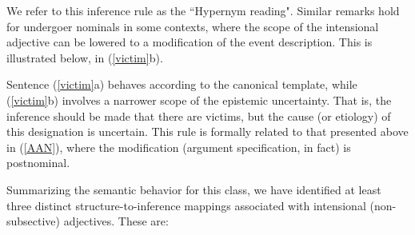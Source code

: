 \documentclass[10pt]{article}
\begin{document}
\noindent We refer to this inference rule as the ``Hypernym reading". 
Similar remarks hold for undergoer nominals in some contexts, where the scope of the intensional adjective can be lowered to a modification of the event description. This is illustrated  below, in (\ref{victim}b).  

\vspace{-0.5em}
\vspace{-0.5em}


\noindent Sentence  (\ref{victim}a) behaves according to the canonical template, while  (\ref{victim}b) involves a narrower scope of the epistemic uncertainty. That is, the inference should be made that there are victims, but the cause (or etiology) of this designation is uncertain. This rule is formally related to that presented above in (\ref{AAN}), where the modification (argument specification, in fact) is postnominal. 

\vspace{-0.5em}
\vspace{-0.5em}


\noindent Summarizing the semantic behavior for this class, we have identified at least three distinct structure-to-inference mappings associated with intensional (non-subsective) adjectives. These are:

\vspace{-0.5em}

\end{document}
